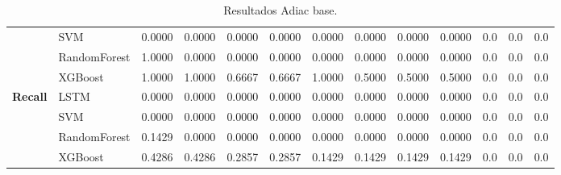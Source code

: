 \begin{table}[h]
\begin{adjustbox}{max width=15cm}
\begin{tabular}{|c|l|r|r|r|r|r|r|r|r|r|r|r|}
			& SVM &  0.0000 &  0.0000 &  0.0000 &  0.0000 &  0.0000 &  0.0000 &  0.0000 &  0.0000 &  0.0 &  0.0 &  0.0 \\
			& RandomForest &  1.0000 &  0.0000 &  0.0000 &  0.0000 &  0.0000 &  0.0000 &  0.0000 &  0.0000 &  0.0 &  0.0 &  0.0 \\
			& XGBoost &  1.0000 &  1.0000 &  0.6667 &  0.6667 &  1.0000 &  0.5000 &  0.5000 &  0.5000 &  0.0 &  0.0 &  0.0 \\
			\hline
			\textbf{Recall} & LSTM &  0.0000 &  0.0000 &  0.0000 &  0.0000 &  0.0000 &  0.0000 &  0.0000 &  0.0000 &  0.0 &  0.0 &  0.0 \\
			& SVM &  0.0000 &  0.0000 &  0.0000 &  0.0000 &  0.0000 &  0.0000 &  0.0000 &  0.0000 &  0.0 &  0.0 &  0.0 \\
			& RandomForest &  0.1429 &  0.0000 &  0.0000 &  0.0000 &  0.0000 &  0.0000 &  0.0000 &  0.0000 &  0.0 &  0.0 &  0.0 \\
			& XGBoost &  0.4286 &  0.4286 &  0.2857 &  0.2857 &  0.1429 &  0.1429 &  0.1429 &  0.1429 &  0.0 &  0.0 &  0.0 \\
			\hline
		\end{tabular}
	\end{adjustbox}
	\caption{Resultados Adiac base.}
	\label{tab:Adiac_base}
\end{table}
\newpage
